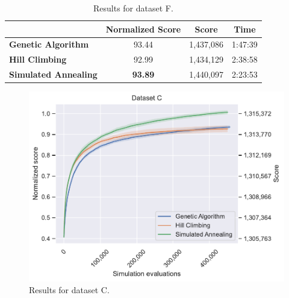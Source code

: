 \begin{table}[h]
\centering\footnotesize\sf
\begin{tabular}{lccc}
\toprule
& Normalized Score & Score & Time \\
\midrule
\textcolor{myblue}{\textbf{Genetic Algorithm}} & 93.44 & 1,437,086 & 1:47:39 \\
\textcolor{myorange}{\textbf{Hill Climbing}} & 92.99 & 1,434,129 & 2:38:58 \\
\textcolor{mygreen}{\textbf{Simulated Annealing}} & \textbf{93.89} & 1,440,097 & 2:23:53 \\
\bottomrule
\end{tabular}
\caption[Results for dataset F]{Results for dataset F.}
\label{tab:dataset_f_results}
\end{table}

\newpage

\begin{figure}
    \centering
    \includegraphics[width=\linewidth]{img/experiments/c_Genetic Algorithm_Hill Climbing_Simulated Annealing.pdf}
    \caption[Results for dataset C]{
        Results for dataset C.
    }
    \label{fig:dataset_c_experiment}
\end{figure}

